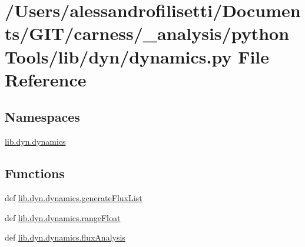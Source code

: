 \hypertarget{a00089}{\section{/\+Users/alessandrofilisetti/\+Documents/\+G\+I\+T/carness/\+\_\+analysis/python\+Tools/lib/dyn/dynamics.py File Reference}
\label{a00089}
}
\subsection*{Namespaces}
\begin{DoxyCompactItemize}
\item 
 \hyperlink{a00140}{lib.\+dyn.\+dynamics}
\end{DoxyCompactItemize}
\subsection*{Functions}
\begin{DoxyCompactItemize}
\item 
def \hyperlink{a00140_a5c7482c3127ef70514cbc82ce1aa9f47}{lib.\+dyn.\+dynamics.\+generate\+Flux\+List}
\item 
def \hyperlink{a00140_acbc0de876640b8d5355bf6a0e4fdef4a}{lib.\+dyn.\+dynamics.\+range\+Float}
\item 
def \hyperlink{a00140_ac3232f52dce6e169a93eba81f8fb926e}{lib.\+dyn.\+dynamics.\+flux\+Analysis}
\end{DoxyCompactItemize}
